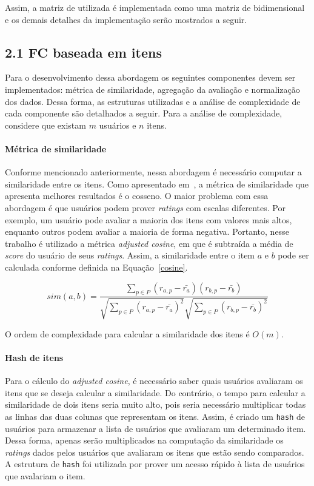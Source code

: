 \documentclass[brazil,a4paper,11pt]{article}
\begin{document}
Assim, a matriz de utilizada é implementada como uma matriz de bidimensional e os demais detalhes da implementação serão mostrados a seguir.


\subsection{2.1 FC baseada em itens}

Para o desenvolvimento dessa abordagem os seguintes componentes devem ser implementados: métrica de similaridade, agregação da avaliação e normalização dos dados. Dessa forma, as estruturas utilizadas e a análise de complexidade de cada componente são detalhados a seguir. Para a análise de complexidade, considere que existam $m$ usuários e $n$ itens.

\paragraph{Métrica de similaridade} Conforme mencionado anteriormente, nessa abordagem é necessário computar a similaridade entre os itens. Como apresentado em~\cite{Jannach2010}, a métrica de similaridade que apresenta melhores resultados é o cosseno. O maior problema com essa abordagem é que usuários podem prover \textit{ratings} com escalas diferentes. Por exemplo, um usuário pode avaliar a maioria dos itens com valores mais altos, enquanto outros podem avaliar a maioria de forma negativa. Portanto, nesse trabalho é utilizado a métrica \textit{adjusted cosine}, em que é subtraída a média de \textit{score} do usuário de seus \textit{ratings}. Assim, a similaridade entre o item $a$ e $b$ pode ser calculada conforme definida na Equação~\ref{cosine}.

\begin{equation}
\label{cosine}
 sim(a,b) = \frac{\sum_{p \in P}(r_{a,p} - \bar{r_a})(r_{b,p} - \bar{r_b})}           {\sqrt{\sum_{p \in P}(r_{a,p} - \bar{r_a})^2} \sqrt{\sum_{p \in P}(r_{b,p} - \bar{r_b})^2}}
\end{equation}

\noindent O ordem de complexidade para calcular a similaridade dos itens é $O(m)$. 

\paragraph{Hash de itens} Para o cálculo do \textit{adjusted cosine}, é necessário saber quais usuários avaliaram os itens que se deseja calcular a similaridade. Do contrário, o tempo para calcular a similaridade de dois itens seria muito alto, pois seria necessário multiplicar todas as linhas das duas colunas que representam os itens. Assim, é criado um \texttt{hash} de usuários para armazenar a lista de usuários que avaliaram um determinado item. Dessa forma, apenas serão multiplicados na computação da similaridade os \textit{ratings} dados pelos usuários que avaliaram os itens que estão sendo comparados. A estrutura de \texttt{hash} foi utilizada por prover um acesso rápido à lista de usuários que avalariam o item. 
\end{document}
